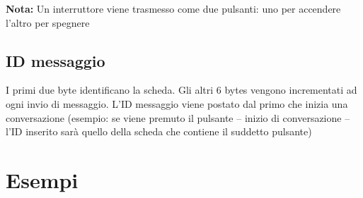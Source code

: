 \documentclass[italian]{article}
\begin{document}
%        
%        
%                
%        
%       
    
    \textbf{Nota:} Un interruttore viene trasmesso come due pulsanti: uno per accendere l'altro per spegnere
    
    \subsection*{ID messaggio}
    
    I primi due byte identificano la scheda. Gli altri 6 bytes vengono incrementati ad ogni invio di messaggio. L'ID messaggio viene postato dal primo che inizia una conversazione (esempio: se viene premuto il pulsante -- inizio di conversazione -- l'ID inserito sarà quello della scheda che contiene il suddetto pulsante)
    
    \section*{Esempi}
    
\end{document}
